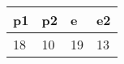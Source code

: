 \documentclass{article}[12pt]
\begin{document}
\centering
\begin{tabular}{llll}
p1&p2&e&e2\\
\hline
18&10&19&13
\end{tabular}

  
\end{document}
